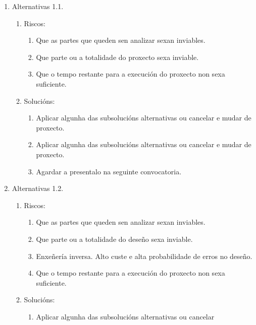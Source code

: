  \begin{enumerate}
  \item Alternativas 1.1.
        \begin{enumerate}
         \item Riscos:
               \begin{enumerate}
                \item Que as partes que queden sen analizar sexan inviables.
                \item Que parte ou a totalidade do proxecto sexa inviable.
                \item Que o tempo restante para a execución do proxecto non
                      sexa suficiente.
               \end{enumerate}
         \item Solucións:
               \begin{enumerate}
                \item Aplicar algunha das subsolucións alternativas ou cancelar
                      e mudar de proxecto.
                \item Aplicar algunha das subsolucións alternativas ou cancelar
                      e mudar de proxecto.
                \item Agardar a presentalo na seguinte convocatoria.
               \end{enumerate}
        \end{enumerate}
  \item Alternativas 1.2.
        \begin{enumerate}
         \item Riscos:
               \begin{enumerate}
                \item Que as partes que queden sen analizar sexan inviables.
                \item Que parte ou a totalidade do deseño sexa inviable.
                \item Enxeñería inversa. Alto custe e alta probabilidade de
                      erros no deseño.
                \item Que o tempo restante para a execución do proxecto non
                      sexa suficiente.
               \end{enumerate}
         \item Solucións:
               \begin{enumerate}
                \item Aplicar algunha das subsolucións alternativas ou cancelar

\end{enumerate}
\end{enumerate}
\end{enumerate}
